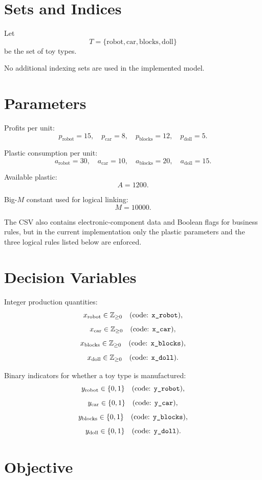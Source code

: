 \section*{Sets and Indices}

Let
\[
T = \{\text{robot},\text{car},\text{blocks},\text{doll}\}
\]
be the set of toy types.

No additional indexing sets are used in the implemented model.

\section*{Parameters}

Profits per unit:
\[
p_{\text{robot}}=15,\quad
p_{\text{car}}=8,\quad
p_{\text{blocks}}=12,\quad
p_{\text{doll}}=5.
\]

Plastic consumption per unit:
\[
a_{\text{robot}}=30,\quad
a_{\text{car}}=10,\quad
a_{\text{blocks}}=20,\quad
a_{\text{doll}}=15.
\]

Available plastic:
\[
A=1200.
\]

Big-\(M\) constant used for logical linking:
\[
M=10000.
\]

The CSV also contains electronic-component data and Boolean flags for business rules, but in the current implementation only the plastic parameters and the three logical rules listed below are enforced.

\section*{Decision Variables}

Integer production quantities:
\[
x_{\text{robot}} \in \mathbb{Z}_{\ge 0} \quad \text{(code: \texttt{x\_robot})},
\]
\[
x_{\text{car}} \in \mathbb{Z}_{\ge 0} \quad \text{(code: \texttt{x\_car})},
\]
\[
x_{\text{blocks}} \in \mathbb{Z}_{\ge 0} \quad \text{(code: \texttt{x\_blocks})},
\]
\[
x_{\text{doll}} \in \mathbb{Z}_{\ge 0} \quad \text{(code: \texttt{x\_doll})}.
\]

Binary indicators for whether a toy type is manufactured:
\[
y_{\text{robot}} \in \{0,1\} \quad \text{(code: \texttt{y\_robot})},
\]
\[
y_{\text{car}} \in \{0,1\} \quad \text{(code: \texttt{y\_car})},
\]
\[
y_{\text{blocks}} \in \{0,1\} \quad \text{(code: \texttt{y\_blocks})},
\]
\[
y_{\text{doll}} \in \{0,1\} \quad \text{(code: \texttt{y\_doll})}.
\]

\section*{Objective}

